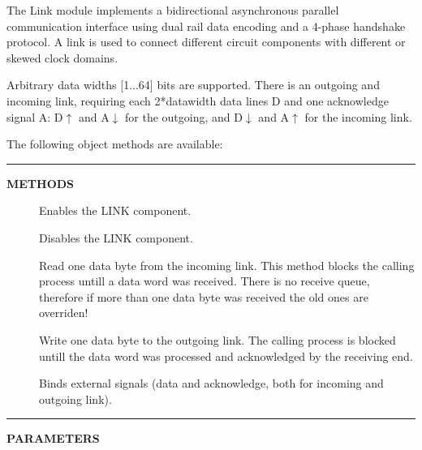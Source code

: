 \documentclass[a4paper,12pt,twoside,english]{article}
\begin{document}
\def\thesubsection{\tocL}
\secII{\label{toclabelL}\thesubsection}
\def\thesubsubsection{\tocLI}
\secIII{\label{toclabelLI}\thesubsubsection}
The Link module implements a bidirectional asynchronous parallel communication interface using dual
rail data encoding and a 4-phase handshake protocol. A link is used to connect different circuit components with different or skewed clock domains. 


\vskip5pt
Arbitrary data widths {[}1...64{]} bits are supported. There is an outgoing and incoming link, requiring each 2*datawidth data lines D and one acknowledge
signal A: D$\uparrow$ and A$\downarrow$ for the outgoing, and D$\downarrow$ and A$\uparrow$ for the incoming link.


\vskip5pt
The following object methods are available:


\vskip5pt
\vskip5pt\color{highlight-color}
{\rule[-1pt]{2em}{1em}\hskip15pt\bf METHODS

}
\color{black}

\begin{description}
\item[] $ $\\
Enables the LINK component.

\item[] $ $\\
Disables the LINK component.

\item[] $ $\\
Read one data byte from the incoming link. This method blocks the calling process untill a data word was received. There is no receive queue, therefore if more
than one data byte was received the old ones are overriden!

\item[] $ $\\
Write one data byte to the outgoing link. The calling process is blocked untill the data word was processed and acknowledged by the receiving end.

\item[] $ $\\
Binds external signals (data and acknowledge, both for incoming and outgoing link).


\end{description}
\vskip5pt\color{highlight-color}
{\rule[-1pt]{2em}{1em}\hskip15pt\bf PARAMETERS

}
\color{black}
\end{document}
